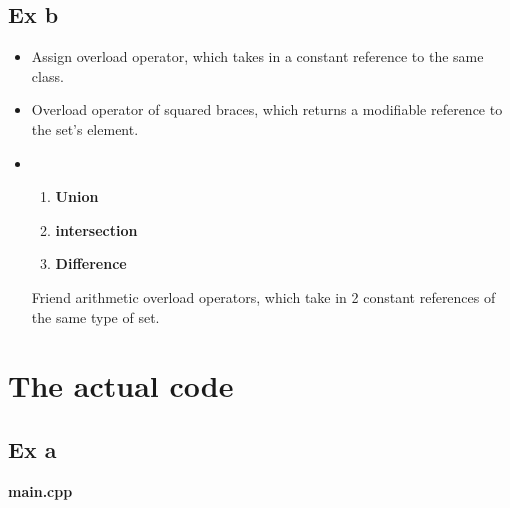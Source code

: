 \documentclass{article}
\begin{document}
		\subsection{Ex b}
			
			\begin{itemize}
				\item

					\par Assign overload operator, which takes in a constant reference to the same class.

				\item

					\par Overload operator of squared braces, which returns a modifiable reference to the set's element.

				\item
					\begin{enumerate}
						\item
							\par \textbf{Union}
						\item
							\par \textbf{intersection}
						\item
							\par \textbf{Difference}
					\end{enumerate}

					\par Friend arithmetic overload operators, which take in 2 constant references of the same type of set.
			\end{itemize}

			\pagebreak

	\section{The actual code}
		\subsection{Ex a}
			

			\begin{minipage}{\textwidth}
				\begin{center}
					\textbf{main.cpp}
				\end{center}

				
			\end{minipage}
\end{document}
